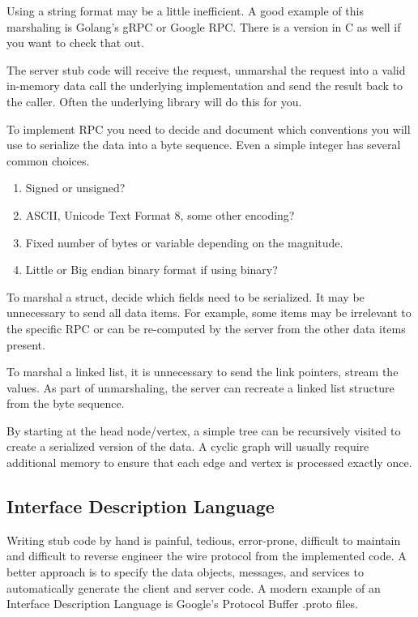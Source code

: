 Using a string format may be a little inefficient.
A good example of this marshaling is Golang's gRPC or Google RPC. There is a version in C as well if you want to check that out.

The server stub code will receive the request, unmarshal the request into a valid in-memory data call the underlying implementation and send the result back to the caller.
Often the underlying library will do this for you.

To implement RPC you need to decide and document which conventions you will use to serialize the data into a byte sequence.
Even a simple integer has several common choices.

\begin{enumerate}
\item Signed or unsigned?
\item ASCII, Unicode Text Format 8, some other encoding?
\item Fixed number of bytes or variable depending on the magnitude.
\item Little or Big endian binary format if using binary?
\end{enumerate}

To marshal a struct, decide which fields need to be serialized.
It may be unnecessary to send all data items.
For example, some items may be irrelevant to the specific RPC or can be re-computed by the server from the other data items present.

To marshal a linked list, it is unnecessary to send the link pointers, stream the values.
As part of unmarshaling, the server can recreate a linked list structure from the byte sequence.

By starting at the head node/vertex, a simple tree can be recursively visited to create a serialized version of the data.
A cyclic graph will usually require additional memory to ensure that each edge and vertex is processed exactly once.

\subsection{Interface Description Language}

Writing stub code by hand is painful, tedious, error-prone, difficult to maintain and difficult to reverse engineer the wire protocol from the implemented code.
A better approach is to specify the data objects, messages, and services to automatically generate the client and server code.
A modern example of an Interface Description Language is Google's Protocol Buffer .proto files.


